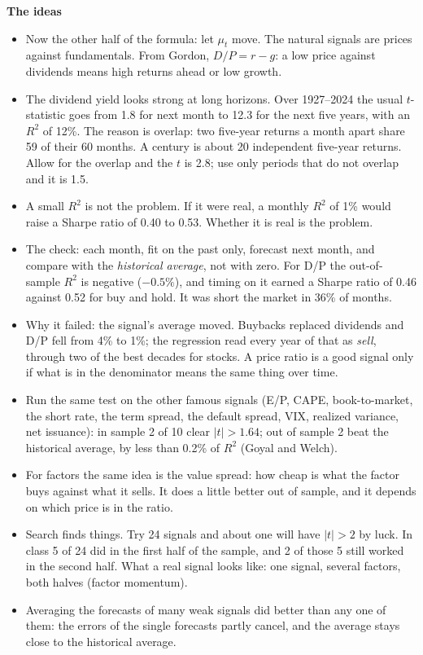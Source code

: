 \documentclass[11pt]{article}
\newcounter{ex}[section]
\newcommand{\head}[1]{\par\medskip\textbf{#1}\par}
\begin{document}
\head{The ideas}
\begin{itemize}
\item Now the other half of the formula: let $\mu_{t}$ move. The natural signals are prices against fundamentals. From
Gordon, $D/P = r - g$: a low price against dividends means high returns ahead or low growth.
\item The dividend yield looks strong at long horizons. Over 1927--2024 the usual $t$-statistic goes from 1.8 for next
month to 12.3 for the next five years, with an $R^{2}$ of 12\%. The reason is overlap: two five-year returns a month
apart share 59 of their 60 months. A century is about 20 independent five-year returns. Allow for the overlap and
the $t$ is 2.8; use only periods that do not overlap and it is 1.5.
\item A small $R^{2}$ is not the problem. If it were real, a monthly $R^{2}$ of 1\% would raise a Sharpe ratio of 0.40 to
0.53. Whether it is real is the problem.
\item The check: each month, fit on the past only, forecast next month, and compare with the \emph{historical average},
not with zero. For D/P the out-of-sample $R^{2}$ is negative ($-0.5\%$), and timing on it earned a Sharpe ratio of 0.46
against 0.52 for buy and hold. It was short the market in 36\% of months.
\item Why it failed: the signal's average moved. Buybacks replaced dividends and D/P fell from 4\% to 1\%; the regression
read every year of that as \emph{sell}, through two of the best decades for stocks. A price ratio is a good signal only
if what is in the denominator means the same thing over time.
\item Run the same test on the other famous signals (E/P, CAPE, book-to-market, the short rate, the term spread, the
default spread, VIX, realized variance, net issuance): in sample 2 of 10 clear $|t| > 1.64$; out of sample 2 beat the
historical average, by less than 0.2\% of $R^{2}$ (Goyal and Welch).
\item For factors the same idea is the value spread: how cheap is what the factor buys against what it sells. It does
a little better out of sample, and it depends on which price is in the ratio.
\item Search finds things. Try 24 signals and about one will have $|t| > 2$ by luck. In class 5 of 24 did in the first
half of the sample, and 2 of those 5 still worked in the second half. What a real signal looks like: one signal,
several factors, both halves (factor momentum).
\item Averaging the forecasts of many weak signals did better than any one of them: the errors of the single forecasts
partly cancel, and the average stays close to the historical average.
\end{itemize}
\end{document}
